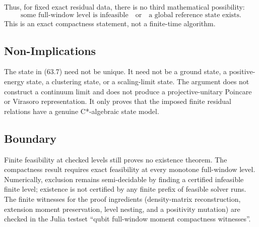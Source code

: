 Thus, for fixed exact residual data, there is no third mathematical
possibility:
\[
  \text{some full-window level is infeasible}
  \quad\text{or}\quad
  \text{a global reference state exists.}
  \tag{63.10}
\]
This is an exact compactness statement, not a finite-time algorithm.

\subsection{Non-Implications}

The state in (63.7) need not be unique.  It need not be a ground state, a
positive-energy state, a clustering state, or a scaling-limit state.  The
argument does not construct a continuum limit and does not produce a
projective-unitary Poincare or Virasoro representation.  It only proves that
the imposed finite residual relations have a genuine C*-algebraic state model.

\subsection{Boundary}

Finite feasibility at checked levels still proves no existence theorem.  The
compactness result requires exact feasibility at every monotone full-window
level.  Numerically, exclusion remains semi-decidable by finding a certified
infeasible finite level; existence is not certified by any finite prefix of
feasible solver runs.  The finite witnesses for the proof ingredients
(density-matrix reconstruction, extension moment preservation, level nesting,
and a positivity mutation) are checked in the Julia testset
``qubit full-window moment compactness witnesses''.
